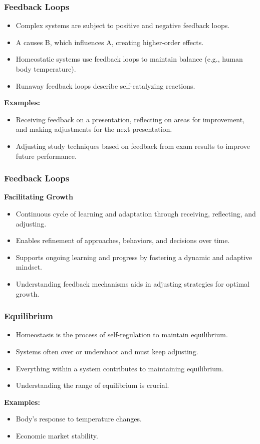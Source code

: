 \begin{frame}[fragile]\frametitle{Feedback Loops}
\begin{itemize}
    \item Complex systems are subject to positive and negative feedback loops.
    \item A causes B, which influences A, creating higher-order effects.
    \item Homeostatic systems use feedback loops to maintain balance (e.g., human body temperature).
    \item Runaway feedback loops describe self-catalyzing reactions.
\end{itemize}
\textbf{Examples:}
\begin{itemize}
	\item Receiving feedback on a presentation, reflecting on areas for improvement, and making adjustments for the next presentation.
	\item Adjusting study techniques based on feedback from exam results to improve future performance.
\end{itemize}
\end{frame}

\begin{frame}[fragile]\frametitle{Feedback Loops}
\textbf{Facilitating Growth}
\begin{itemize}
	\item Continuous cycle of learning and adaptation through receiving, reflecting, and adjusting.
	\item Enables refinement of approaches, behaviors, and decisions over time.
	\item Supports ongoing learning and progress by fostering a dynamic and adaptive mindset.
	\item Understanding feedback mechanisms aids in adjusting strategies for optimal growth.
\end{itemize}
\end{frame}

\begin{frame}[fragile]\frametitle{Equilibrium}
\begin{itemize}
    \item Homeostasis is the process of self-regulation to maintain equilibrium.
    \item Systems often over or undershoot and must keep adjusting.
    \item Everything within a system contributes to maintaining equilibrium.
    \item Understanding the range of equilibrium is crucial.
\end{itemize}
\textbf{Examples:}
\begin{itemize}
    \item Body's response to temperature changes.
    \item Economic market stability.
\end{itemize}
\end{frame}

